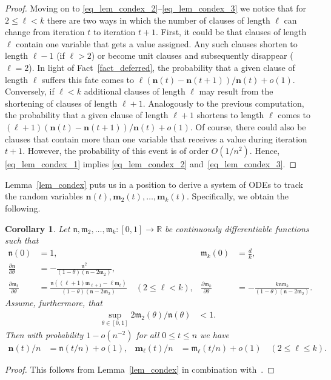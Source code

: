 \documentclass[10pt,reqno]{amsart}
\numberwithin{equation}{section}
\renewcommand{\vec}[1]{\boldsymbol{#1}}
\newcommand\fm{\mathfrak m}
\newcommand\fn{\mathfrak n}
\newcommand\vm{\vec m}
\newcommand\vn{\vec n}
\newcommand\RR{\mathbb{R}}
\newcommand\Lem{Lemma}
\newcommand\Thm{Theorem}
\newtheorem{corollary}[definition]{Corollary}
\begin{document}
\begin{proof}
	Moving on to \eqref{eq_lem_condex_2}--\eqref{eq_lem_condex_3} we notice that for $2\leq\ell<k$ there are two ways in which the number of clauses of length $\ell$ can change from iteration $t$ to iteration $t+1$.
	First, it could be that clauses of length $\ell$ contain one variable that gets a value assigned.
	Any such clauses shorten to length $\ell-1$ (if $\ell>2$) or become unit clauses and subsequently disappear ($\ell=2$).
	In light of Fact~\ref{fact_deferred}, the probability that a given clause of length $\ell$ suffers this fate comes to $\ell(\vn(t)-\vn(t+1))/\vn(t)+o(1)$.
	Conversely, if $\ell<k$ additional clauses of length $\ell$ may result from the shortening of clauses of length $\ell+1$.
	Analogously to the previous computation, the probability that a given clause of length $\ell+1$ shortens to length $\ell$ comes to $(\ell+1)(\vn(t)-\vn(t+1))/\vn(t)+o(1)$.
	Of course, there could also be clauses that contain more than one variable that receives a value during iteration $t+1$.
	However, the probability of this event is of order $O(1/n^2)$.
	Hence, \eqref{eq_lem_condex_1} implies \eqref{eq_lem_condex_2} and~\eqref{eq_lem_condex_3}.
\end{proof}

\Lem~\ref{lem_condex} puts us in a position to derive a system of ODEs to track the random variables $\vn(t),\vm_2(t),\ldots,\vm_k(t)$.
Specifically, we obtain the following.

\begin{corollary}\label{cor_ODE}
	Let $\fn,\fm_2,\ldots,\fm_k:[0,1]\to\RR$ be continuously differentiable functions such that
	\begin{align}\label{eqODE1}
		\fn(0)&=1,&\fm_k(0)&=\frac dk,\\
		\frac{\partial\fn}{\partial\theta}&=-\frac{\fn^2}{(1-\theta)(\fn-2\fm_2)},\label{eqODE2}\\
		\frac{\partial\fm_\ell}{\partial\theta}&=\frac{\fn((\ell+1)\fm_{\ell+1}-\ell\fm_\ell)}{(1-\theta)(\fn-2\fm_2)}\quad(2\leq\ell<k),&
		\frac{\partial\fm_k}{\partial\theta}&=-\frac{k\fn\fm_k}{(1-\theta)(\fn-2\fm_2)}.\label{eqODE3}
	\end{align}
	Assume, furthermore, that
	\begin{align}\label{eqODE4}
		\sup_{\theta\in[0,1]}2\fm_2(\theta)/\fn(\theta)&<1.
	\end{align}
	Then with probability $1-o(n^{-2})$ for all $0\leq t\leq n$ we have
	\begin{align*}
		\vn(t)/n&=\fn(t/n)+o(1),& \vm_\ell(t)/n&=\fm_\ell(t/n)+o(1)\quad(2\leq\ell\leq k).
	\end{align*}
\end{corollary}
\begin{proof}
	This follows from \Lem~\ref{lem_condex} in combination with~\cite[\Thm~2]{Wormald}.
\end{proof}
\end{document}
